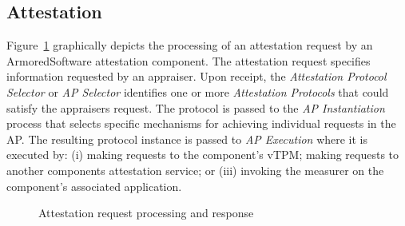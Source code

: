 \documentclass[10pt]{article}
\begin{document}
\subsection{Attestation}

Figure~\ref{fig:attestation} graphically depicts the processing of an
attestation request by an ArmoredSoftware attestation component.  The
attestation request specifies information requested by an appraiser.
Upon receipt, the \emph{Attestation Protocol Selector} or \emph{AP
  Selector} identifies one or more \emph{Attestation Protocols} that
could satisfy the appraisers request.  The protocol is passed to the
\emph{AP Instantiation} process that selects specific mechanisms for
achieving individual requests in the AP.  The resulting protocol
instance is passed to \emph{AP Execution} where it is executed by: (i)
making requests to the component's vTPM; making requests to another
components attestation service; or (iii) invoking the measurer on the
component's associated application.

\begin{figure}
\centering 
{}
  \caption{Attestation request processing and response}
  \label{fig:attestation}
\end{figure}
\end{document}
